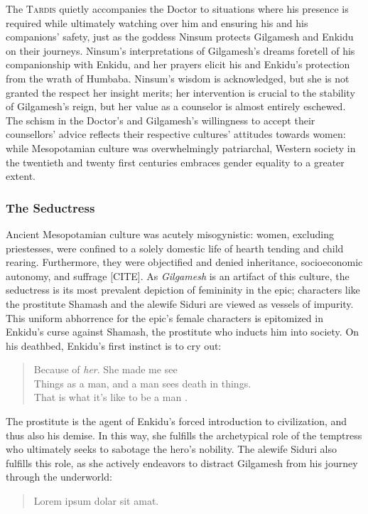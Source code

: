 \documentclass[10pt,a4paper]{article}
\begin{document}
The \textsc{Tardis} quietly accompanies the Doctor to situations where his presence is required while ultimately watching over him and ensuring his and his companions’ safety, just as the goddess Ninsum protects Gilgamesh and Enkidu on their journeys. Ninsum’s interpretations of Gilgamesh’s dreams foretell of his companionship with Enkidu, and her prayers elicit his and Enkidu’s protection from the wrath of Humbaba. Ninsum’s wisdom is acknowledged, but she is not granted the respect her insight merits; her intervention is crucial to the stability of Gilgamesh’s reign, but her value as a counselor is almost entirely eschewed. The schism in the Doctor’s and Gilgamesh’s willingness to accept their counsellors’ advice reflects their respective cultures’ attitudes towards women: while Mesopotamian culture was overwhelmingly patriarchal, Western society in the twentieth and twenty first centuries embraces gender equality to a greater extent.

\subsubsection{The Seductress}
%
%
Ancient Mesopotamian culture was acutely misogynistic: women, excluding priestesses, were confined to a solely domestic life of hearth tending and child rearing. Furthermore, they were objectified and denied inheritance, socioeconomic autonomy, and suffrage [CITE]. As \emph{Gilgamesh} is an artifact of this culture, the seductress is its most prevalent depiction of femininity in the epic; characters like the prostitute Shamash and the alewife Siduri are viewed as vessels of impurity. This uniform abhorrence for the epic’s female characters is epitomized in Enkidu’s curse against Shamash, the prostitute who inducts him into society. On his deathbed, Enkidu’s first instinct is to cry out: 
\begin{quote}
Because of \emph{her}. She made me see
\\Things as a man, and a man sees death in things.
\\That is what it’s like to be a man \cite{mason1970gilgamesh}.
\end{quote}
The prostitute is the agent of Enkidu’s forced introduction to civilization, and thus also his demise. In this way, she fulfills the archetypical role of the temptress who ultimately seeks to sabotage the hero’s nobility. The alewife Siduri also fulfills this role, as she actively endeavors to distract Gilgamesh from his journey through the underworld: 
\begin{quote}
Lorem ipsum dolar sit amat.
\end{quote}
\end{document}
